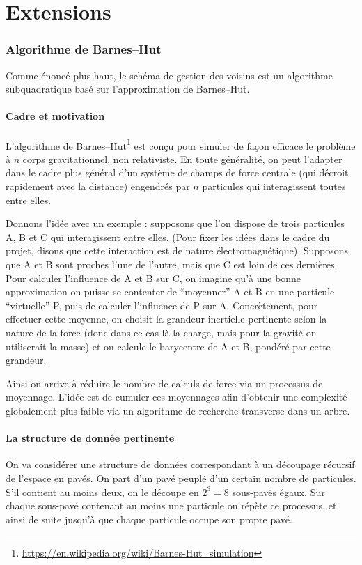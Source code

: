 \documentclass[12pt, letterpaper, twoside]{article}
\begin{document}
\newpage

\part*{Extensions}
\section{Algorithme de Barnes--Hut}
Comme énoncé plus haut, le schéma de gestion des voisins est un algorithme subquadratique basé sur l'approximation de Barnes--Hut.
\subsection*{Cadre et motivation}
L'algorithme de Barnes--Hut\footnote{\url{https://en.wikipedia.org/wiki/Barnes-Hut_simulation}} est conçu pour simuler de façon efficace le problème à $n$ corps gravitationnel, non relativiste. En toute généralité, on peut l'adapter dans le cadre plus général d'un système de champs de force centrale (qui décroit rapidement avec la distance) engendrés par $n$ particules qui interagissent toutes entre elles.

Donnons l'idée avec un exemple : supposons que l'on dispose de trois particules A, B et C qui interagissent entre elles. (Pour fixer les idées dans le cadre du projet, disons que cette interaction est de nature électromagnétique). Supposons que A et B sont proches l'une de l'autre, mais que C est loin de ces dernières. Pour calculer l'influence de A et B sur C, on imagine qu'à une bonne approximation on puisse se contenter de ``moyenner'' A et B en une particule ``virtuelle'' P, puis de calculer l'influence de P sur A. Concrètement, pour effectuer cette moyenne, on choisit la grandeur inertielle pertinente selon la nature de la force (donc dans ce cas-là la charge, mais pour la gravité on utiliserait la masse) et on calcule le barycentre de A et B, pondéré par cette grandeur.

Ainsi on arrive à réduire le nombre de calculs de force via un processus de moyennage. L'idée est de cumuler ces moyennages afin d'obtenir une complexité globalement plus faible via un algorithme de recherche transverse dans un arbre.

\subsection*{La structure de donnée pertinente}
On va considérer une structure de données correspondant à un découpage récursif de l'espace en pavés. On part d'un pavé peuplé d'un certain nombre de particules. S'il contient au moins deux, on le découpe en $2^3 = 8$ sous-pavés égaux. Sur chaque sous-pavé contenant au moins une particule on répète ce processus, et ainsi de suite jusqu'à que chaque particule occupe son propre pavé.
\end{document}
